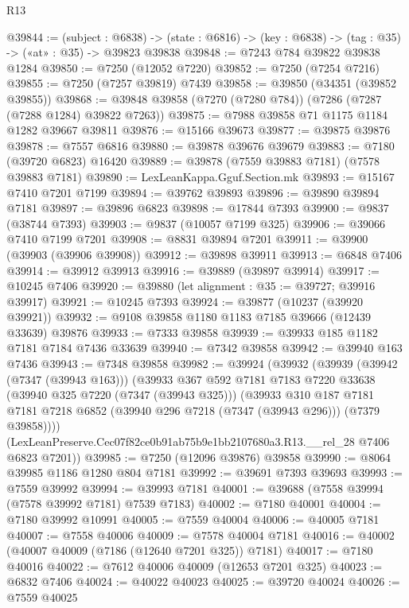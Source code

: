 \begin{lexlean}{R13}
\begin{coremodule}
@39844 := (subject : @6838) ->
  (state : @6816) -> (key : @6838) -> (tag : @35) -> («at» : @35) -> @39823 @39838
@39848 := @7243 @784 @39822 @39838 @1284
@39850 := @7250 (@12052 @7220)
@39852 := @7250 (@7254 @7216)
@39855 := @7250 (@7257 @39819) @7439
@39858 := @39850 (@34351 (@39852 @39855))
@39868 := @39848 @39858 (@7270 (@7280 @784)) (@7286 (@7287 (@7288 @1284) @39822 @7263))
@39875 := @7988 @39858 @71 @1175 @1184 @1282 @39667 @39811
@39876 := @15166 @39673
@39877 := @39875 @39876
@39878 := @7557 @6816
@39880 := @39878 @39676 @39679
@39883 := @7180 (@39720 @6823) @16420
@39889 := @39878 (@7559 @39883 @7181) (@7578 @39883 @7181)
@39890 := LexLeanKappa.Gguf.Section.mk
@39893 := @15167 @7410 @7201 @7199
@39894 := @39762 @39893
@39896 := @39890 @39894 @7181
@39897 := @39896 @6823
@39898 := @17844 @7393
@39900 := @9837 (@38744 @7393)
@39903 := @9837 (@10057 @7199 @325)
@39906 := @39066 @7410 @7199 @7201
@39908 := @8831 @39894 @7201
@39911 := @39900 (@39903 (@39906 @39908))
@39912 := @39898 @39911
@39913 := @6848 @7406
@39914 := @39912 @39913
@39916 := @39889 (@39897 @39914)
@39917 := @10245 @7406
@39920 := @39880 (let alignment : @35 := @39727; @39916 @39917)
@39921 := @10245 @7393
@39924 := @39877 (@10237 (@39920 @39921))
@39932 := @9108 @39858 @1180 @1183 @7185 @39666 (@12439 @33639) @39876
@39933 := @7333 @39858
@39939 := @39933 @185 @1182 @7181 @7184 @7436 @33639
@39940 := @7342 @39858
@39942 := @39940 @163 @7436
@39943 := @7348 @39858
@39982 := @39924
    (@39932
      (@39939
        (@39942 (@7347 (@39943 @163)))
        (@39933
          @367
          @592
          @7181
          @7183
          @7220
          @33638
          (@39940 @325 @7220 (@7347 (@39943 @325)))
          (@39933
            @310
            @187
            @7181
            @7181
            @7218
            @6852
            (@39940 @296 @7218 (@7347 (@39943 @296)))
            (@7379 @39858))))
      (LexLeanPreserve.Cec07f82ce0b91ab75b9e1bb2107680a3.R13.__rel_28 @7406 @6823 @7201))
@39985 := @7250 (@12096 @39876) @39858
@39990 := @8064 @39985 @1186 @1280 @804 @7181
@39992 := @39691 @7393 @39693
@39993 := @7559 @39992
@39994 := @39993 @7181
@40001 := @39688 (@7558 @39994 (@7578 @39992 @7181) @7539 @7183)
@40002 := @7180 @40001
@40004 := @7180 @39992 @10991
@40005 := @7559 @40004
@40006 := @40005 @7181
@40007 := @7558 @40006
@40009 := @7578 @40004 @7181
@40016 := @40002 (@40007 @40009 (@7186 (@12640 @7201 @325)) @7181)
@40017 := @7180 @40016
@40022 := @7612 @40006 @40009 (@12653 @7201 @325)
@40023 := @6832 @7406
@40024 := @40022 @40023
@40025 := @39720 @40024
@40026 := @7559 @40025

\end{coremodule}
\end{lexlean}
